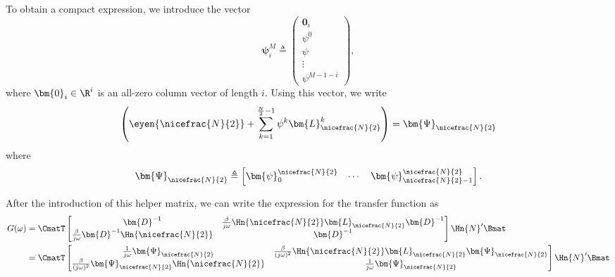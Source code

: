 To obtain a compact expression, we introduce the vector
\begin{equation}
    \label{eq:def_psi_vec}
    \bm{\psi}^M_i \triangleq
    \begin{pmatrix}
        \bm{0}_i \\
        \psi^0 \\
        \psi \\
        \vdots \\
        \psi^{M-1-i}
    \end{pmatrix},
\end{equation}
where $\bm{0}_i \in \R^{i}$ is an all-zero column vector of length $i$. Using this vector, we write
\begin{equation}
    \left( \eyen{\nicefrac{N}{2}} + \sum_{k=1}^{\frac{N}{2}-1}\psi^k \bm{L}_{\nicefrac{N}{2}}^k \right) =\bm{\Psi}_{\nicefrac{N}{2}}
\end{equation}
where
\begin{equation}
    \bm{\Psi}_{\nicefrac{N}{2}} \triangleq
    \begin{bmatrix}
        \bm{\psi}^{\nicefrac{N}{2}}_0 & \cdots & \bm{\psi}^{\nicefrac{N}{2}}_{\nicefrac{N}{2}-1}
    \end{bmatrix}.
\end{equation}

After the introduction of this helper matrix, we can write the expression for the transfer function as
\begin{align}
    G(\omega) & = \CmatT
    \begin{bmatrix}
        \bm{D}^{-1} & \frac{\beta}{j\omega}\Hn{\nicefrac{N}{2}}\bm{L}_{\nicefrac{N}{2}}\bm{D}^{-1}  \\
        \frac{\beta}{j\omega}\bm{D}^{-1}\Hn{\nicefrac{N}{2}} & \bm{D}^{-1}
    \end{bmatrix}
    \Hn{N}' \Bmat \\
    & = \CmatT
    \begin{bmatrix}
        \frac{1}{j\omega}\bm{\Psi}_{\nicefrac{N}{2}} & \frac{\beta}{(j\omega)^2}\Hn{\nicefrac{N}{2}}\bm{L}_{\nicefrac{N}{2}}\bm{\Psi}_{\nicefrac{N}{2}}  \\
        \frac{\beta}{(j\omega)^2}\bm{\Psi}_{\nicefrac{N}{2}}\Hn{\nicefrac{N}{2}} & \frac{1}{j\omega}\bm{\Psi}_{\nicefrac{N}{2}}
    \end{bmatrix}
    \Hn{N}' \Bmat
\end{align}

